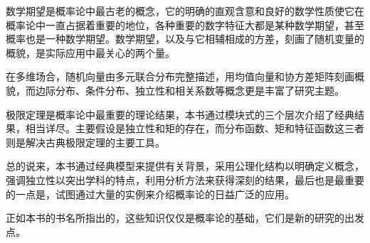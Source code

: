 \documentclass[../main.tex]{subfiles}
\begin{document}
数学期望是概率论中最古老的概念，它的明确的直观含意和良好的数学性质使它在概率论中一直占据着重要的地位，各种重要的数字特征大都是某种数学期望，甚至概率也是一种数学期望。数学期望，以及与它相辅相成的方差，刻画了随机变量的概貌，是实际应用中最关心的两个量。

在多维场合，随机向量由多元联合分布完整描述，用均值向量和协方差矩阵刻画概貌，而边际分布、条件分布、独立性和相关系数等概念更是丰富了研究主题。

极限定理是概率论中最重要的理论结果，本书通过模块式的三个层次介绍了经典结果，相当详尽。主要假设是独立性和矩的存在，而分布函数、矩和特征函数这三者则是解决古典极限定理的主要工具。

总的说来，本书通过经典模型来提供有关背景，采用公理化结构以明确定义概念，强调独立性以突出学科的特点，利用分析方法来获得深刻的结果，最后也是最重要的一点是，试图通过大量的实例来介绍概率论的日益广泛的应用。

正如本书的书名所指出的，这些知识仅仅是概率论的基础，它们是新的研究的出发点。
\end{document}
